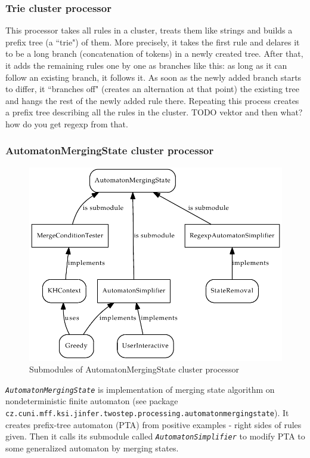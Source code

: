 \documentclass[a4paper,10pt,oneside]{article}
\newcommand{\myscale}{0.74}
\newcommand{\code}[1]{\texttt{#1}}
\newcommand{\jmodule}[1]{\texttt{\textit{#1}}}
\begin{document}
\subsubsection{Trie cluster processor}
This processor takes all rules in a cluster, treats them like strings and builds a prefix tree (a ``trie") of them. More precisely, it takes the first rule and delares it to be a long branch (concatenation of tokens) in a newly created tree. After that, it adds the remaining rules one by one as branches like this: as long as it can follow an existing branch, it follows it. As soon as the newly added branch starts to differ, it ``branches off" (creates an alternation at that point) the existing tree and hangs the rest of the newly added rule there. Repeating this process creates a prefix tree describing all the rules in the cluster.
TODO vektor and then what? how do you get regexp from that.

\subsubsection{AutomatonMergingState cluster processor}
\begin{figure}
	\centering\includegraphics[scale=\myscale]{automaton_merging_state_modules}
	\caption{Submodules of AutomatonMergingState cluster processor} \label{automaton_merging_state_modules}
\end{figure}
\jmodule{AutomatonMergingState} is implementation of merging state algorithm on nondeterministic finite automaton (see package \code{cz.cuni.mff.ksi.jinfer.twostep.processing.automatonmergingstate}).
It creates prefix-tree automaton (PTA) from positive examples - right sides of rules given.
Then it calls its submodule called \jmodule{AutomatonSimplifier} to  modify PTA to some generalized 
automaton by merging states.
\end{document}
